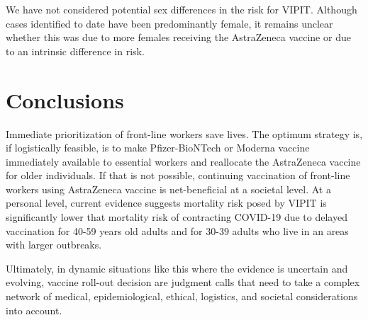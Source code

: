 \documentclass[]{interact}
\theoremstyle{plain}%
\theoremstyle{definition}
\theoremstyle{remark}
\begin{document}
We have not considered potential sex differences in the risk for VIPIT.
Although cases identified to date have been predominantly female, it
remains unclear whether this was due to more females receiving the
AstraZeneca vaccine or due to an intrinsic difference in risk.

\hypertarget{conclusions}{%
\section{Conclusions}\label{conclusions}}

Immediate prioritization of front-line workers save lives. The optimum
strategy is, if logistically feasible, is to make Pfizer-BioNTech or
Moderna vaccine immediately available to essential workers and
reallocate the AstraZeneca vaccine for older individuals. If that is not
possible, continuing vaccination of front-line workers using AstraZeneca
vaccine is net-beneficial at a societal level. At a personal level,
current evidence suggests mortality risk posed by VIPIT is significantly
lower that mortality risk of contracting COVID-19 due to delayed
vaccination for 40-59 years old adults and for 30-39 adults who live in
an areas with larger outbreaks.

Ultimately, in dynamic situations like this where the evidence is
uncertain and evolving, vaccine roll-out decision are judgment calls
that need to take a complex network of medical, epidemiological,
ethical, logistics, and societal considerations into account.



\end{document}
